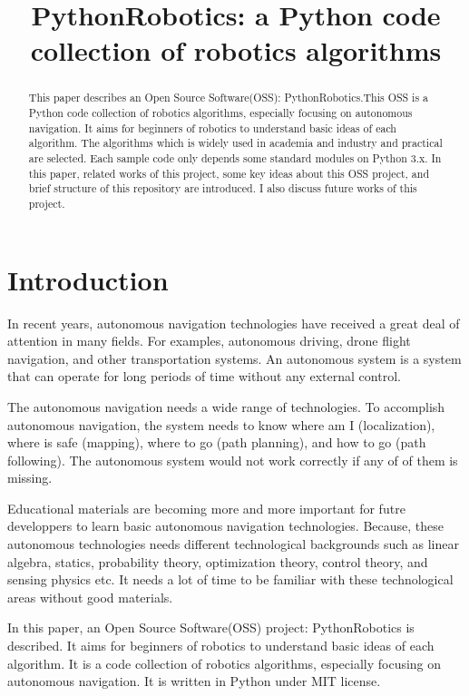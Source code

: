\documentclass{bmvc2k}
\title{PythonRobotics: a Python code collection of robotics algorithms}
\begin{document}
\maketitle

\begin{abstract}
This paper describes an Open Source Software(OSS): PythonRobotics\cite{github}.This OSS is a Python code collection of robotics algorithms, especially focusing on autonomous navigation. It aims for beginners of robotics to understand basic ideas of each algorithm. The algorithms which is widely used in academia and industry and practical are selected. Each sample code only depends some standard modules on Python 3.x. In this paper, related works of this project, some key ideas about this OSS project, and brief structure of this repository are introduced. I also discuss future works of this project. 

\end{abstract}

\section{Introduction}

In recent years, autonomous navigation technologies have received a great deal of attention in many fields. 
For examples, autonomous driving\cite{pathplanning}, drone flight navigation, and other transportation systems.
An autonomous system is a system that can operate for long periods of time without any external control.

The autonomous navigation needs a wide range of technologies.
To accomplish autonomous navigation, the system needs to know where am I (localization), where is safe (mapping), where to go (path planning), and how to go (path following). 
The autonomous system would not work correctly if any of of them is missing.

Educational materials are becoming more and more important for futre developpers to learn basic autonomous navigation technologies.
Because, these autonomous technologies needs different technological backgrounds such as linear algebra, statics, probability theory, optimization theory, control theory, and sensing physics etc. 
It needs a lot of time to be familiar with these technological areas without good materials.

In this paper, an Open Source Software(OSS) project: PythonRobotics\cite{github} is described.
It aims for beginners of robotics to understand basic ideas of each algorithm.
It is a code collection of robotics algorithms, especially focusing on autonomous navigation. It is written in Python\cite{python} under MIT license\cite{mit}. 
\end{document}
